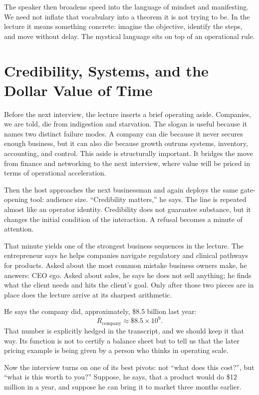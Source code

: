 The speaker then broadens speed into the language of mindset and manifesting. We need not inflate that vocabulary into a theorem it is not trying to be. In the lecture it means something concrete: imagine the objective, identify the steps, and move without delay. The mystical language sits on top of an operational rule.

\section{Credibility, Systems, and the Dollar Value of Time}

Before the next interview, the lecture inserts a brief operating aside. Companies, we are told, die from indigestion and starvation. The slogan is useful because it names two distinct failure modes. A company can die because it never secures enough business, but it can also die because growth outruns systems, inventory, accounting, and control. This aside is structurally important. It bridges the move from finance and networking to the next interview, where value will be priced in terms of operational acceleration.

Then the host approaches the next businessman and again deploys the same gate-opening tool: audience size. ``Credibility matters,'' he says. The line is repeated almost like an operator identity. Credibility does not guarantee substance, but it changes the initial condition of the interaction. A refusal becomes a minute of attention.

That minute yields one of the strongest business sequences in the lecture. The entrepreneur says he helps companies navigate regulatory and clinical pathways for products. Asked about the most common mistake business owners make, he answers: CEO ego. Asked about sales, he says he does not sell anything; he finds what the client needs and hits the client's goal. Only after those two pieces are in place does the lecture arrive at its sharpest arithmetic.

He says the company did, approximately, \$8.5 billion last year:
\begin{equation}
R_{\mathrm{company}} \approx \$8.5\times 10^{9}.
\end{equation}
That number is explicitly hedged in the transcript, and we should keep it that way. Its function is not to certify a balance sheet but to tell us that the later pricing example is being given by a person who thinks in operating scale.

Now the interview turns on one of its best pivots: not ``what does this cost?'', but ``what is this worth to you?'' Suppose, he says, that a product would do \$12 million in a year, and suppose he can bring it to market three months earlier.

